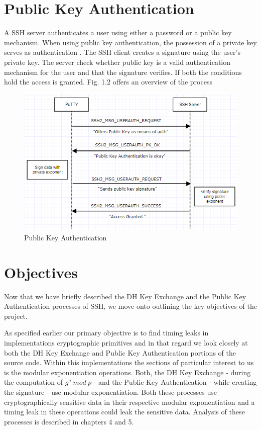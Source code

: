 \documentclass{report}
\begin{document}
\section{Public Key Authentication}
A SSH server authenticates a user using either a password or a public key mechanism. When using public key authentication, the possession of a private key serves as authentication \cite{rfc4252}. The SSH client creates a signature using the user's private key. The server check whether public key is a valid authentication mechanism for the user and that the signature verifies. If both the conditions hold the access is granted. Fig. 1.2 offers an overview of the process\par
\begin{figure}[ht]
\caption{Public Key Authentication}
\centering
\includegraphics[width=1\textwidth]{SSH_PK_Auth.png}
\end{figure}
\section{Objectives}
\par
Now that we have briefly described the DH Key Exchange and the Public Key Authentication processes of SSH, we move onto outlining the key objectives of the project.\par
As specified earlier our primary objective is to find timing leaks in implementations cryptographic primitives and in that regard we look closely at both the DH Key Exchange and Public Key Authentication portions of the source code. Within this implementations the sections of particular interest to us is the modular exponentiation operations. Both, the DH Key Exchange - during the computation of \(g^a\ mod\ p\) - and the Public Key Authentication - while creating the signature - use modular exponentiation. Both these processes use cryptographically sensitive data in their respective modular exponentiation and a timing leak in these operations could leak the sensitive data. Analysis of these processes is described in chapters 4 and 5.\par
\end{document}
